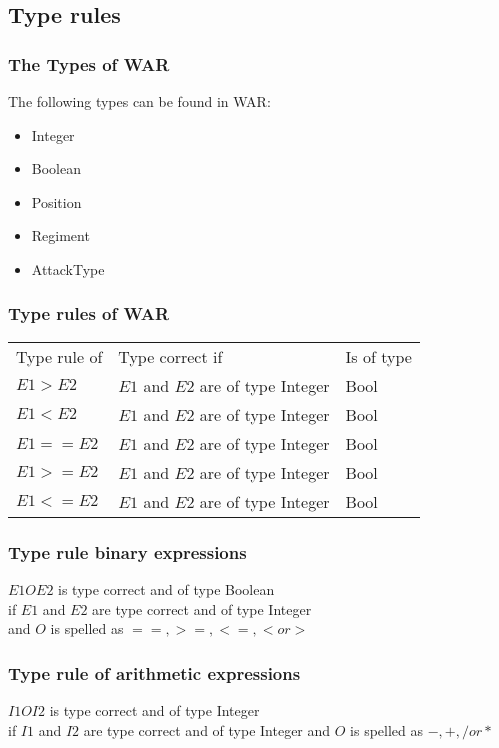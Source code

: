 \subsection{Type rules}
	\subsubsection{The Types of WAR}
		The following types can be found in WAR: \\
		\begin{itemize}
			\item Integer
			\item Boolean
			\item Position
			\item Regiment
			\item AttackType
		\end{itemize}
	\subsubsection{Type rules of WAR}
	\begin{tabular}{|l|l|l|}
		Type rule of	&	Type correct if						& Is of type	\\
		$E1 > E2$		&	$E1$ and $E2$ are of type Integer	&	Bool		\\
		$E1 < E2$		&	$E1$ and $E2$ are of type Integer	&	Bool		\\
		$E1 == E2$		&	$E1$ and $E2$ are of type Integer	&	Bool		\\
		$E1 >= E2$		&	$E1$ and $E2$ are of type Integer	&	Bool		\\
		$E1 <= E2$		&	$E1$ and $E2$ are of type Integer	&	Bool		\\
	\end{tabular}
	\subsubsection*{Type rule binary expressions}
		$E1 O E2$ is type correct and of type Boolean\\
		if $E1$ and $E2$ are type correct and of type Integer \\
		and $O$ is spelled as $==,>=,<=,< or >$
		
	\subsubsection{Type rule of arithmetic expressions}
		$I1 O I2$ is type correct and of type Integer\\
		if $I1$ and $I2$ are type correct and of type Integer
		and $O$ is spelled as $-,+,/ or *$

